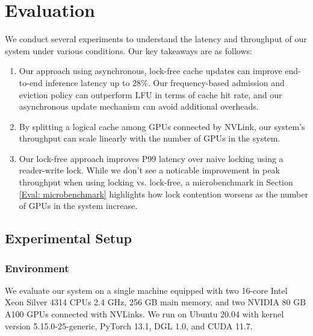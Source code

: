 \chapter{Evaluation} \label{Evaluation}
We conduct several experiments to understand the latency and throughput of our system under various conditions. Our key takeaways are as follows:

\begin{enumerate}
    \item Our approach using asynchronous, lock-free cache updates can improve end-to-end inference latency up to 28\%. Our frequency-based admission and eviction policy can outperform LFU in terms of cache hit rate, and our asynchronous update mechanism can avoid additional overheads.
    \item By splitting a logical cache among GPUs connected by NVLink, our system's throughput can scale linearly with the number of GPUs in the system.
    \item Our lock-free approach improves P99 latency over naive locking using a reader-write lock. While we don't see a noticable improvement in peak throughput when using locking vs. lock-free, a microbenchmark in Section \ref{Eval: microbenchmark} highlights how lock contention worsens as the number of GPUs in the system increase.
\end{enumerate}

\section{Experimental Setup}
\subsection{Environment} \label{Eval: Test hardware}
We evaluate our system on a single machine equipped with two 16-core Intel Xeon Silver 4314 CPUs \@ 2.4 GHz, 256 GB main memory, and two NVIDIA 80 GB A100 GPUs connected with NVLinks. We run on Ubuntu 20.04 with kernel version 5.15.0-25-generic, PyTorch 13.1, DGL 1.0, and CUDA 11.7.

